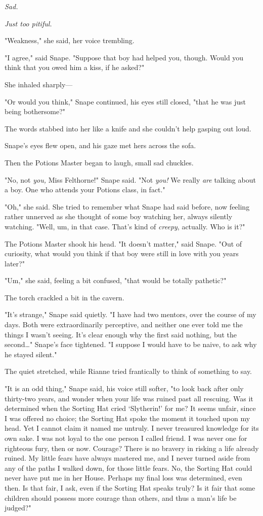 \emph{Sad.}

\emph{Just too pitiful.}

"Weakness," she said, her voice trembling.

"I agree," said Snape. "Suppose that boy had helped you, though. Would you 
think that you owed him a kiss, if he asked?"

She inhaled sharply---

"Or would you think," Snape continued, his eyes still closed, "that he was just 
being bothersome?"

The words stabbed into her like a knife and she couldn't help gasping out loud.

Snape's eyes flew open, and his gaze met hers across the sofa.

Then the Potions Master began to laugh, small sad chuckles.

"No, not \emph{you,} Miss Felthorne!" Snape said. "Not \emph{you!} We really 
\emph{are} talking about a boy. One who attends your Potions class, in fact."

"Oh," she said. She tried to remember what Snape had said before, now feeling 
rather unnerved as she thought of some boy watching her, always silently 
watching. "Well, um, in that case. That's kind of \emph{creepy}, actually. Who 
is it?"

The Potions Master shook his head. "It doesn't matter," said Snape. "Out of 
curiosity, what would you think if that boy were still in love with you years 
later?"

"Um," she said, feeling a bit confused, "that would be totally pathetic?"

The torch crackled a bit in the cavern.

"It's strange," Snape said quietly. "I have had two mentors, over the course of 
my days. Both were extraordinarily perceptive, and neither one ever told me the 
things I wasn't seeing. It's clear enough why the first said nothing, but the 
second{\ldots}" Snape's face tightened. "I suppose I would have to be naive, to 
ask why he stayed silent."

The quiet stretched, while Rianne tried frantically to think of something to 
say.

"It is an odd thing," Snape said, his voice still softer, "to look back after 
only thirty-two years, and wonder when your life was ruined past all rescuing. 
Was it determined when the Sorting Hat cried `Slytherin!' for me? It seems 
unfair, since I was offered no choice; the Sorting Hat spoke the moment it 
touched upon my head. Yet I cannot claim it named me untruly. I never treasured 
knowledge for its own sake. I was not loyal to the one person I called friend. 
I was never one for righteous fury, then or now. Courage? There is no bravery 
in risking a life already ruined. My little fears have always mastered me, and 
I never turned aside from any of the paths I walked down, for those little 
fears. No, the Sorting Hat could never have put me in her House. Perhaps my 
final loss was determined, even then. Is that fair, I ask, even if the Sorting 
Hat speaks truly? Is it fair that some children should possess more courage 
than others, and thus a man's life be judged?"

